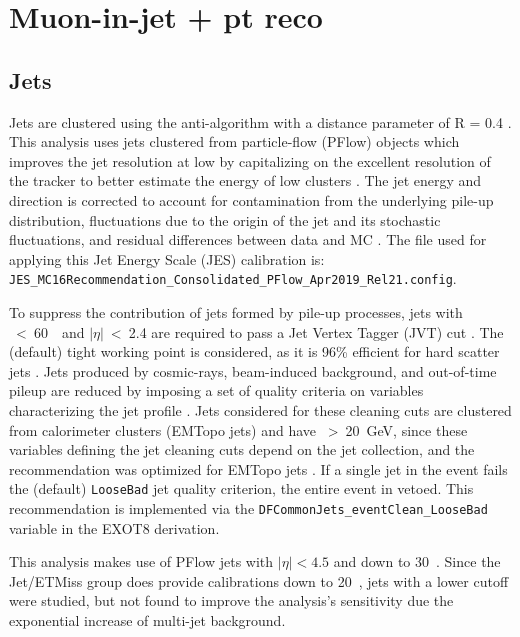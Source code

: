 \section{Muon-in-jet + pt reco}

\subsection{Jets}
\label{subsec:jets-analysis}

Jets are clustered using the anti-\kt algorithm with a distance parameter of R = 0.4 \cite{Cacciari:2008gp}.
This analysis uses jets clustered from particle-flow (PFlow) objects which improves the jet resolution at low \pT by capitalizing on the excellent resolution of the tracker to better estimate the energy of low \pT clusters \cite{PERF-2015-09}.  
The jet energy and direction is corrected to account for contamination from the underlying pile-up distribution, fluctuations due to the origin of the jet and its stochastic fluctuations, and residual differences between data and MC \cite{JETM-2018-05}.
The file used for applying this Jet Energy Scale (JES) calibration is: \\
{ \tt JES\_MC16Recommendation\_Consolidated\_PFlow\_Apr2019\_Rel21.config}.

To suppress the contribution of jets formed by pile-up processes, jets with \pT~<~60~\GeV~and $|\eta|$~<~2.4 are required to pass a Jet Vertex Tagger (JVT) cut \cite{ATLAS-CONF-2014-018}. The (default) tight working point is considered, as it is 96\% efficient for hard scatter jets \cite{jvt-twiki}.
Jets produced by cosmic-rays, beam-induced background, and out-of-time pileup are reduced by imposing a set of quality criteria on variables characterizing the jet profile \cite{ATLAS-CONF-2015-029}. Jets considered for these cleaning cuts are clustered from calorimeter clusters (EMTopo jets) and have \pT~>~20~GeV, since these variables defining the jet cleaning cuts depend on the jet collection, and the recommendation was optimized for EMTopo jets \cite{jet-cleaning-twiki}. 
If a single jet in the event fails the (default) {\tt LooseBad} jet quality criterion, the entire event in vetoed. This recommendation is implemented via the {\tt DFCommonJets\_eventClean\_LooseBad} variable in the EXOT8 derivation.

This analysis makes use of PFlow jets with $|\eta| < 4.5$ and \pT down to 30~\GeV. 
Since the Jet/ETMiss group does provide calibrations down to 20~\GeV, jets with a lower \pT cutoff were studied, but not found to improve the analysis's sensitivity due the exponential increase of multi-jet background. 

